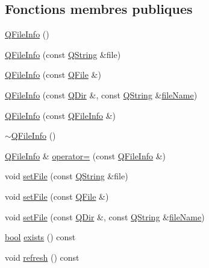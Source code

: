 \subsection*{Fonctions membres publiques}
\begin{DoxyCompactItemize}
\item 
\hyperlink{class_q_file_info_a7cfa76234a4b4c22f071a41452c5f7df}{Q\+File\+Info} ()
\item 
\hyperlink{class_q_file_info_a0b6a4788de6ee6c2b66a0841cd212bbe}{Q\+File\+Info} (const \hyperlink{class_q_string}{Q\+String} \&file)
\item 
\hyperlink{class_q_file_info_a33f5eaacd649938cf6a915817384c1f4}{Q\+File\+Info} (const \hyperlink{class_q_file}{Q\+File} \&)
\item 
\hyperlink{class_q_file_info_a6d57e31d5a4a8e6b6d405d2dd68641b5}{Q\+File\+Info} (const \hyperlink{class_q_dir}{Q\+Dir} \&, const \hyperlink{class_q_string}{Q\+String} \&\hyperlink{class_q_file_info_aabf62d1b0490784be027aa3de085bec1}{file\+Name})
\item 
\hyperlink{class_q_file_info_ab147e0bd29337bd3d8d911c5666a941a}{Q\+File\+Info} (const \hyperlink{class_q_file_info}{Q\+File\+Info} \&)
\item 
\hyperlink{class_q_file_info_a37e6d4bbfffdd1b9d055923f3f0f4d7c}{$\sim$\+Q\+File\+Info} ()
\item 
\hyperlink{class_q_file_info}{Q\+File\+Info} \& \hyperlink{class_q_file_info_aa2a8e3037097440bf77f07d1c51f0369}{operator=} (const \hyperlink{class_q_file_info}{Q\+File\+Info} \&)
\item 
void \hyperlink{class_q_file_info_a6215e0e8c9466ee7db82c13259655b98}{set\+File} (const \hyperlink{class_q_string}{Q\+String} \&file)
\item 
void \hyperlink{class_q_file_info_a9a90b344f26a58641fa784efbaa3ce6e}{set\+File} (const \hyperlink{class_q_file}{Q\+File} \&)
\item 
void \hyperlink{class_q_file_info_a12f26e174efbe009fbda56c5344db89a}{set\+File} (const \hyperlink{class_q_dir}{Q\+Dir} \&, const \hyperlink{class_q_string}{Q\+String} \&\hyperlink{class_q_file_info_aabf62d1b0490784be027aa3de085bec1}{file\+Name})
\item 
\hyperlink{qglobal_8h_a1062901a7428fdd9c7f180f5e01ea056}{bool} \hyperlink{class_q_file_info_aef52b667c4809f0e0061c6f39ab72aea}{exists} () const 
\item 
void \hyperlink{class_q_file_info_aed469b2b04fe04a80424e8d94f7d9978}{refresh} () const 
\item 

\end{DoxyCompactItemize}
